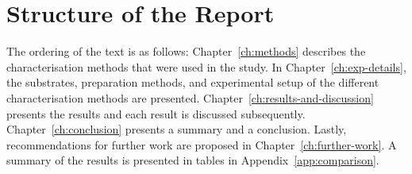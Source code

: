 %
\section{Structure of the Report}
The ordering of the text is as follows: Chapter~\ref{ch:methods} describes the characterisation methods that were used in the study. In Chapter~\ref{ch:exp-details}, the substrates, preparation methods, and experimental setup of the different characterisation methods are presented. Chapter~\ref{ch:results-and-discussion} presents the results and each result is discussed subsequently. Chapter~\ref{ch:conclusion} presents a summary and a conclusion. Lastly, recommendations for further work are proposed in Chapter~\ref{ch:further-work}. A summary of the results is presented in tables in Appendix~\ref{app:comparison}.
%
